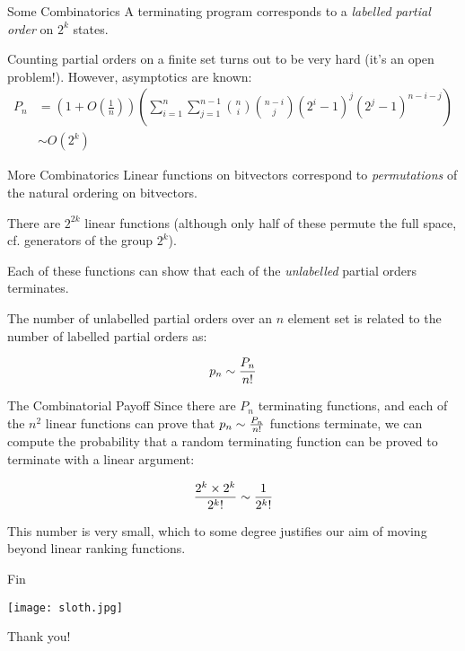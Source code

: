 \documentclass[xcolor=pdftex,t,11pt]{beamer}
\begin{document}
\begin{frame}{Some Combinatorics}
A terminating program corresponds to a \emph{labelled partial order} on $2^k$ states.

\vspace{.7em}

Counting partial orders on a finite set turns out to be very hard (it's an open problem!).  However, asymptotics are known:
\begin{align*}
 P_n & = \left(1 + O \left( \frac{1}{n} \right) \right) \left( \sum_{i=1}^n \sum_{j=1}^{n-1} \binom{n}{i} \binom{n-i}{j} (2^i - 1)^j (2^j - 1)^{n - i - j}\right) \\
     & \sim O\left( 2^k \right)
\end{align*}

\end{frame}

\begin{frame}{More Combinatorics}
Linear functions on bitvectors correspond to \emph{permutations} of the natural ordering on bitvectors.

\vspace{1em}

There are $2^{2k}$ linear functions (although only half of these permute the full space, cf. generators of the group $2^k$).

\vspace{1em}

Each of these functions can show that each of the \emph{unlabelled} partial orders terminates.

The number of unlabelled partial orders over an $n$ element set is related to the number of labelled partial orders as:

$$p_n \sim {P_n \over n!}$$
\end{frame}

\begin{frame}{The Combinatorial Payoff}
Since there are $P_n$ terminating functions, and each of the $n^2$ linear functions can prove that
$p_n \sim {P_n \over n!}$ functions terminate, we can compute the probability that a random terminating
function can be proved to terminate with a linear argument:

$${2^k \times 2^k \over {2^k}!} \sim {1 \over {2^k}!}$$

\pause

\vspace{1em}

This number is very small, which to some degree justifies our aim of moving beyond linear ranking functions.

\end{frame}


\begin{frame}[fragile]{Fin}

\begin{center}
\texttt{[image: sloth.jpg]}

\Huge
 Thank you!
\end{center}

\end{frame}
\end{document}
